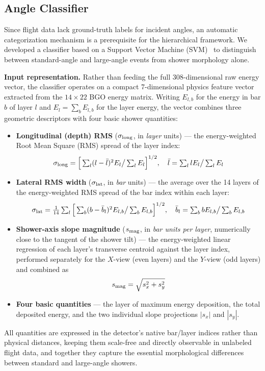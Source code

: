 \documentclass[preprint,12pt]{elsarticle}
\begin{document}
\subsection{Angle Classifier}
\label{ssec:classifier}

Since flight data lack ground-truth labels for incident angles, an automatic categorization mechanism is a prerequisite for the hierarchical framework. We developed a classifier based on a Support Vector Machine (SVM)~\cite{cortes_1995, pedregosa_2011} to distinguish between standard-angle and large-angle events from shower morphology alone.

\textbf{Input representation.} Rather than feeding the full 308-dimensional raw energy vector, the classifier operates on a compact 7-dimensional physics feature vector extracted from the $14\times22$ BGO energy matrix. Writing $E_{l,b}$ for the energy in bar $b$ of layer $l$ and $E_l=\sum_b E_{l,b}$ for the layer energy, the vector combines three geometric descriptors with four basic shower quantities:
\begin{itemize}
\item \textbf{Longitudinal (depth) RMS} ($\sigma_{\rm long}$, in \emph{layer} units) --- the energy-weighted Root Mean Square (RMS) spread of the layer index:
\begin{equation}
\textstyle
\sigma_{\rm long}=\Big[\sum_l (l-\bar l)^2E_l \big/ \sum_l E_l\Big]^{1/2},
\quad
\bar l=\sum_l lE_l \big/ \sum_l E_l
\end{equation}
\item \textbf{Lateral RMS width} ($\sigma_{\rm lat}$, in \emph{bar} units) --- the average over the 14 layers of the energy-weighted RMS spread of the bar index within each layer:
\begin{equation}
\textstyle
\sigma_{\rm lat}=\tfrac{1}{14}\sum_l\Big[\sum_b (b-\bar b_l)^2E_{l,b} \big/ \sum_b E_{l,b}\Big]^{1/2},
\quad
\bar b_l=\sum_b bE_{l,b} \big/ \sum_b E_{l,b}
\end{equation}
\item \textbf{Shower-axis slope magnitude} ($s_{\rm mag}$, in \emph{bar units per layer}, numerically close to the tangent of the shower tilt) --- the energy-weighted linear regression of each layer's transverse centroid against the layer index, performed separately for the $X$-view (even layers) and the $Y$-view (odd layers) and combined as
\begin{equation}
\textstyle
s_{\rm mag}=\sqrt{s_x^2+s_y^2}
\end{equation}
\item \textbf{Four basic quantities} --- the layer of maximum energy deposition, the total deposited energy, and the two individual slope projections $|s_x|$ and $|s_y|$.
\end{itemize}
All quantities are expressed in the detector's native bar/layer indices rather than physical distances, keeping them scale-free and directly observable in unlabeled flight data, and together they capture the essential morphological differences between standard and large-angle showers.
\end{document}
